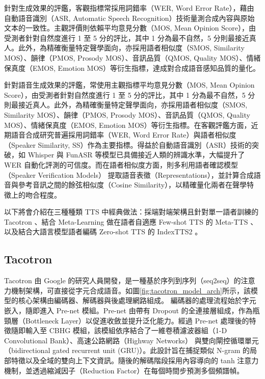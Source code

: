 {\color{gray}
針對生成效果的評鑑，客觀指標常採用詞錯率（WER, Word Error Rate），藉由自動語音識別（ASR, Automatic Speech Recognition）技術量測合成內容與原始文本的一致性。主觀評價則依賴平均意見分數（MOS, Mean Opinion Score），由受測者針對自然度進行 1 至 5 分的評比，其中 1 分為最不自然，5 分則最接近真人。此外，為精確衡量特定聲學面向，亦採用語者相似度（SMOS, Similarity MOS）、韻律（PMOS, Prosody MOS）、音訊品質（QMOS, Quality MOS）、情緒保真度（EMOS, Emotion MOS）等衍生指標，達成對合成語音感知品質的量化。
}

{\color{red}
針對語音生成效果的評鑑，常使用主觀指標平均意見分數（MOS, Mean Opinion Score），由受測者針對自然度進行 1 至 5 分的評比，其中 1 分為最不自然，5 分則最接近真人。此外，為精確衡量特定聲學面向，亦採用語者相似度（SMOS, Similarity MOS）、韻律（PMOS, Prosody MOS）、音訊品質（QMOS, Quality MOS）、情緒保真度（EMOS, Emotion MOS）等衍生指標。在客觀評鑑方面，近期語音合成研究普遍採用詞錯率（WER, Word Error Rate）與語者相似度（Speaker Similarity, SS）作為主要指標。得益於自動語音識別（ASR）技術的突破，如 Whisper 與 FunASR 等模型已具備接近人類的辨識水準，大幅提升了 WER 自動化評測的可信度。而在語者相似度方面，則多利用語者確認模型（Speaker Verification Models） 提取語音表徵（Representations），並計算合成語音與參考音訊之間的餘弦相似度（Cosine Similarity），以精確量化兩者在聲學特徵上的吻合程度。
}

以下將會介紹在三種種類 TTS 中經典做法：{\color{red}採端對端架構且針對單一語者訓練的 Tacotron} \cite{wang2017tacotron}、結合 Meta-Learning 做在語者自適應 Few-shot TTS 的 Meta-TTS \cite{huang2022metatts}、以及結合大語言模型語者編碼 Zero-shot TTS 的 IndexTTS2 \cite{zhou2025indextts2}。

\subsection{Tacotron}


Tacotron 由 Google 的研究人員開發，是一種基於序列到序列（seq2seq）\cite{sutskever2014seq2seq}的注意力機制架構，可直接從字元合成語音。如圖\ref{fig:tacotron_model_arch}所示，該模型的核心架構由編碼器、解碼器與後處理網路組成。{\color{red} 編碼器的處理流程始於字元嵌入，隨即進入 Pre-net 模組。Pre-net 由帶有 Dropout 的全連接層組成，作為瓶頸層（Bottleneck Layer）以促進收斂並提升泛化能力。經過 Pre-net 處理後的特徵隨即輸入至 CBHG 模組，該模組依序結合了一維卷積濾波器組（1-D Convolutional Bank）、高速公路網路（Highway Networks）\cite{srivastava2015highway} 與雙向閘控循環單元（bidirectional gated recurrent unit (GRU)\cite{chung2014empirical}）。此設計旨在捕捉類似 N-gram 的局部特徵以及全域的雙向上下文資訊。隨後的解碼階段採用內容導向的 tanh 注意力機制，並透過縮減因子（Reduction Factor）在每個時間步預測多個頻譜幀。}

